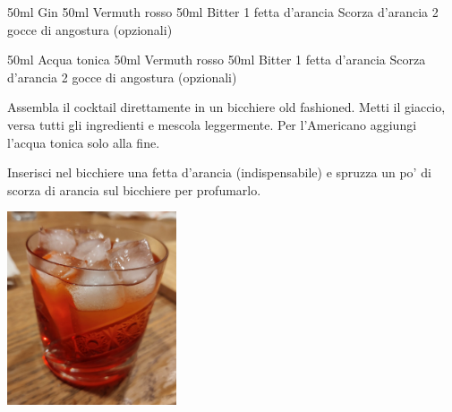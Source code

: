 \cooktime[]{-}%
\begin{ingreds}
\ingredients[Negroni]
	50ml Gin 
	50ml Vermuth rosso 
	50ml Bitter 
	1 fetta d'arancia 
	Scorza d'arancia
	2 gocce di angostura (opzionali) 

\columnbreak

\ingredients[Americano]
	50ml Acqua tonica
	50ml Vermuth rosso
	50ml Bitter
	1 fetta d'arancia
	Scorza d'arancia
	2 gocce di angostura (opzionali)

\end{ingreds}

\begin{method}
Assembla il cocktail direttamente in un bicchiere old fashioned. Metti il giaccio, versa tutti gli ingredienti e mescola leggermente. Per l'Americano aggiungi l'acqua tonica solo alla fine.

Inserisci nel bicchiere una fetta d'arancia (indispensabile) e spruzza un po' di scorza di arancia sul bicchiere per profumarlo.


\end{method}


\begin{center}
\includegraphics[width=5cm]{img/negroni.jpg}
\end{center}


